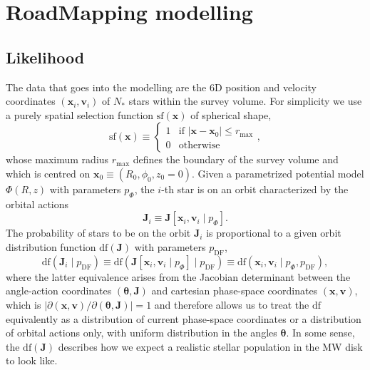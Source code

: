\documentclass[iop,revtex4,numberedappendix,appendixfloats]{emulateapj}
\newcommand{\vect}[1]{\boldsymbol{#1}}
\begin{document}
\section{RoadMapping modelling}

\subsection{Likelihood} \label{sec:likelihood}

The data that goes into the modelling are the 6D position and velocity coordinates $(\vect{x}_i,\vect{v}_i)$ of $N_*$ stars within the survey volume. For simplicity we use a purely spatial selection function $\text{sf}(\vect{x})$ of spherical shape,
\begin{equation*}
\text{sf}(\vect{x}) \equiv \begin{cases} 1 &\mbox{if } \left| \vect{x}-\vect{x}_0 \right| \leq r_\text{max} \\
0 & \mbox{otherwise} \end{cases},
\end{equation*}
whose maximum radius $r_\text{max}$ defines the boundary of the survey volume and which is centred on $\vect{x}_0 \equiv (R_0,\phi_0,z_0=0)$. Given a parametrized potential model $\Phi(R,z)$ with parameters $p_\Phi$, the $i$-th star is on an orbit characterized by the orbital actions 
\begin{equation*}
\vect{J}_i \equiv \vect{J}[\vect{x}_i,\vect{v}_i \mid p_\Phi].
\end{equation*}
The probability of stars to be on the orbit $\vect{J}_i$ is proportional to a given orbit distribution function $\text{df}(\vect{J})$ with parameters $p_\text{DF}$,
\begin{equation*}
\text{df}(\vect{J}_i \mid p_\text{DF}) \equiv \text{df}(\vect{J}[\vect{x}_i,\vect{v}_i \mid p_\Phi] \mid p_\text{DF}) \equiv \text{df}(\vect{x}_i,\vect{v}_i \mid p_\Phi,p_\text{DF}),
\end{equation*} 
where the latter equivalence arises from the Jacobian determinant between the angle-action coordinates $(\vect{\theta},\vect{J})$ and cartesian phase-space coordinates $(\vect{x},\vect{v})$, which is $\left| \partial (\vect{x},\vect{v}) / \partial(\vect{\theta},\vect{J})\right|=1$ and therefore allows us to treat the $\text{df}$ equivalently as a distribution of current phase-space coordinates or a distribution of orbital actions only, with uniform distribution in the angles $\vect{\theta}$. In some sense, the $\text{df}(\vect{J})$ describes how we expect a realistic stellar population in the MW disk to look like.
\end{document}
